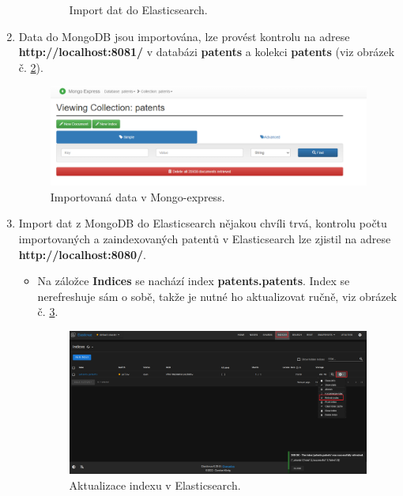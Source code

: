 \begin{enumerate}
\begin{itemize}
\begin{figure}[H]
		\caption{Import dat do Elasticsearch.}
		\label{fig:elastic_import}
		\end{figure}
	\end{itemize}
\item Data do MongoDB jsou importována, lze provést kontrolu na adrese \textbf{http://localhost:8081/} v databázi \textbf{patents} a kolekci \textbf{patents} (viz obrázek č. \ref{fig:mongo_done_import}).
		\begin{figure}[H]
		\centering
		\includegraphics[width=15cm]{img/manual/mongo_import_done}
		\caption{Importovaná data v Mongo-express.}
		\label{fig:mongo_done_import}
		\end{figure}
\item Import dat z MongoDB do Elasticsearch nějakou chvíli trvá, kontrolu počtu importovaných a zaindexovaných patentů v Elasticsearch lze zjistil na adrese \textbf{http://localhost:8080/}.
	\begin{itemize}
	\item Na záložce \textbf{Indices} se nachází index \textbf{patents.patents}. Index se nerefreshuje sám o sobě, takže je nutné ho aktualizovat ručně, viz obrázek č. \ref{fig:refresh_index}.
		\begin{figure}[H]
		\centering
		\includegraphics[width=15cm]{img/manual/refresh_index}
		\caption{Aktualizace indexu v Elasticsearch.}
		\label{fig:refresh_index}
		\end{figure}
	\end{itemize}
\end{enumerate}